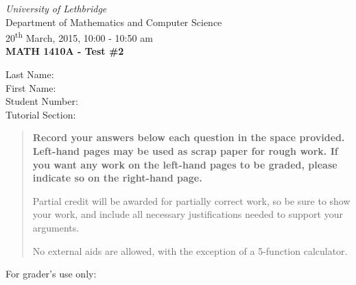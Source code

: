 \documentclass[12pt]{article}
\newcommand{\skipline}{\vspace{12pt}}
\begin{document}
\author{Instructor: Sean Fitzpatrick}
\thispagestyle{plain}
\begin{center}
\emph{University of Lethbridge}\\
Department of Mathematics and Computer Science\\
20\textsuperscript{th} March, 2015, 10:00 - 10:50 am\\
{\bf MATH 1410A - Test \#2}\\
\end{center}
\skipline \skipline \skipline \noindent \skipline
Last Name:\underline{\hspace{353pt}}\\
\skipline
First Name:\underline{\hspace{350pt}}\\
\skipline
Student Number:\underline{\hspace{323pt}}\\
\skipline
Tutorial Section: \underline{\hspace{320pt}}\\


\vspace{0.5in}


\begin{quote}
 {\bf Record your answers below each question in the space provided.    Left-hand pages may be used as scrap paper for rough work.  If you want any work on the left-hand pages to be graded, please indicate so on the right-hand page.
 
 \bigskip
 
Partial credit will be awarded for partially correct work, so be sure to show your work, and include all necessary justifications needed to support your arguments.

\bigskip

No external aids are allowed, with the exception of a 5-function calculator.}
\end{quote}


\vspace{0.5in}

For grader's use only:
\end{document}
